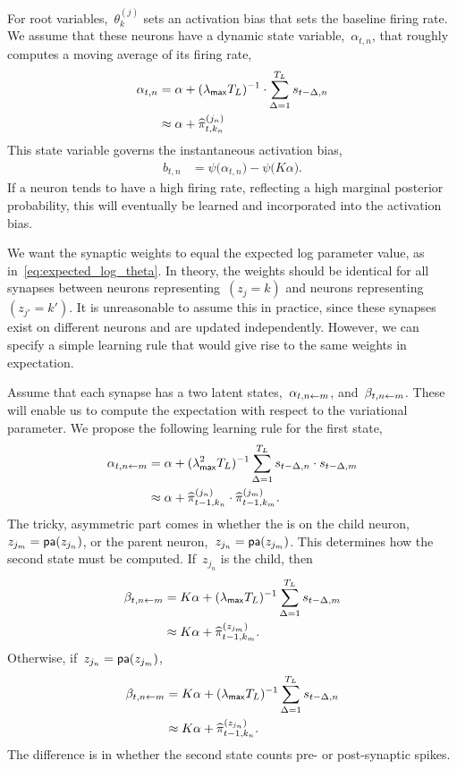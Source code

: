 For root variables,~$\theta_k^{(j)}$ sets an activation bias that sets
the baseline firing rate. We assume that these neurons have a dynamic
state variable,~$\alpha_{t,n}$, that roughly computes a moving average
of its firing rate,
\begin{align*}
  \alpha_{t,n} &= \alpha + (\lambda_{\mathsf{max}} T_L)^{-1} \cdot \sum_{\Delta = 1}^{T_L} s_{t-\Delta ,n} \\
  &\approx \alpha + \widehat{\pi}_{t,k_n}^{(j_n)}
\end{align*}
This state variable governs the instantaneous activation bias,
\begin{align*}
  b_{t,n} &= \psi \big(\alpha_{t,n} \big) - \psi \big( K\alpha \big).
\end{align*}
If a neuron tends to have a high firing rate, reflecting a high 
marginal posterior probability, this will eventually be learned and
incorporated into the activation bias.



We want the synaptic weights to equal the expected log parameter
value, as in~\eqref{eq:expected_log_theta}.  In theory, the weights
should be identical for all synapses between neurons
representing~$(z_j=k)$ and neurons representing~$(z_{j'}=k')$.  It is
unreasonable to assume this in practice, since these synapses exist on
different neurons and are updated independently. However, we can
specify a simple learning rule that would give rise to the same
weights in expectation.

Assume that each synapse has a two latent states,~$\alpha_{t, n \leftarrow m}$,
and~$\beta_{t,n \leftarrow m}$. These will enable us to compute
the expectation with respect to the variational parameter.
We propose the following learning rule for the first state,
\begin{align*}
  \alpha_{t, n \leftarrow m} &=
  \alpha +
  (\lambda_{\mathsf{max}}^2 T_L)^{-1}  \sum_{\Delta = 1}^{T_L} s_{t-\Delta ,n} \cdot s_{t-\Delta,m} \\
  &\approx \alpha + \widehat{\pi}_{t-1,k_n}^{(j_n)} \cdot \widehat{\pi}_{t-1,k_m}^{(j_m)}. 
\end{align*}
The tricky, asymmetric part comes in whether the is on the
child neuron,~$z_{j_m} = \mathsf{pa}(z_{j_n})$, or the parent
neuron,~$z_{j_n}= \mathsf{pa}(z_{j_m})$. This determines how the second
state must be computed. If~$z_{j_n}$ is the child, then
\begin{align*}
  \beta_{t,n \leftarrow m} &= K\alpha + (\lambda_{\mathsf{max}} T_L)^{-1} \sum_{\Delta = 1}^{T_L} s_{t -\Delta, m} \\
  &\approx K\alpha + \widehat{\pi}_{t-1,k_m}^{(z_{j_m})}.
\end{align*}
Otherwise, if~$z_{j_n} = \mathsf{pa}(z_{j_m})$,
\begin{align*}
  \beta_{t,n \leftarrow m} &= K\alpha + (\lambda_{\mathsf{max}} T_L)^{-1} \sum_{\Delta = 1}^{T_L} s_{t -\Delta, n} \\
  &\approx K\alpha + \widehat{\pi}_{t-1,k_n}^{(z_{j_n})}.
\end{align*}
The difference is in whether the second state counts pre- or post-synaptic
spikes. 

